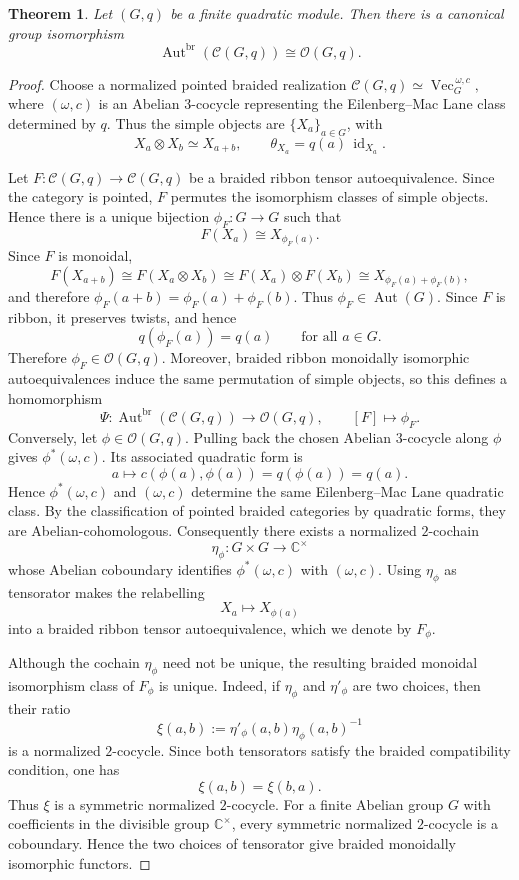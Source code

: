 \documentclass[12pt]{amsart}
\numberwithin{equation}{section}
\newtheorem{theorem}{Theorem}[section]
\theoremstyle{definition}
\begin{document}
\begin{theorem}
\label{thm:Eq-O}
Let $(G,q)$ be a finite quadratic module. Then there is a canonical group isomorphism
$$
\operatorname{Aut}^{\mathrm{br}}(\mathcal C(G,q))\cong \mathcal O(G,q).
$$
\end{theorem}

\begin{proof}
Choose a normalized pointed braided realization $
\mathcal C(G,q)\simeq \operatorname{Vec}^{\,\omega,c}_G,$ where $(\omega,c)$ is an Abelian $3$-cocycle representing the
Eilenberg--Mac Lane class determined by $q$. Thus the simple objects
are $\{X_a\}_{a\in G}$, with
$$
X_a\otimes X_b\simeq X_{a+b},
\qquad
\theta_{X_a}=q(a)\,\operatorname{id}_{X_a}.
$$

Let $F:\mathcal C(G,q)\rightarrow\mathcal C(G,q)$ be a braided ribbon tensor autoequivalence. Since the category is pointed, $F$ permutes the isomorphism classes of simple objects. Hence there is a unique bijection $\phi_F:G\to G$ such that
$$
F(X_a)\cong X_{\phi_F(a)}.
$$
Since $F$ is monoidal,
$$
F(X_{a+b})
\cong
F(X_a\otimes X_b)
\cong
F(X_a)\otimes F(X_b)
\cong
X_{\phi_F(a)+\phi_F(b)},
$$
and therefore $\phi_F(a+b)=\phi_F(a)+\phi_F(b).$ Thus $\phi_F\in\operatorname{Aut}(G)$. Since $F$ is ribbon, it preserves twists, and hence
$$
q(\phi_F(a))=q(a)\qquad \text{for all }a\in G.
$$
Therefore $\phi_F\in\mathcal O(G,q)$. Moreover, braided ribbon
monoidally isomorphic autoequivalences induce the same permutation of
simple objects, so this defines a homomorphism
$$
\Psi:
\operatorname{Aut}^{\mathrm{br}}(\mathcal C(G,q))
\longrightarrow
\mathcal O(G,q),
\qquad
[F]\longmapsto\phi_F.
$$
Conversely, let $\phi\in\mathcal O(G,q)$. Pulling back the chosen Abelian $3$-cocycle along $\phi$ gives $\phi^*(\omega,c).$ Its associated quadratic form is
$$
a\longmapsto c(\phi(a),\phi(a))
=q(\phi(a))
=q(a).
$$
Hence $\phi^*(\omega,c)$ and $(\omega,c)$ determine the same Eilenberg--Mac Lane quadratic class. By the classification of pointed braided categories by quadratic forms, they are Abelian-cohomologous. Consequently there exists a normalized $2$-cochain
$$
\eta_\phi:G\times G\longrightarrow\mathbb C^\times
$$
whose Abelian coboundary identifies $\phi^*(\omega,c)$ with $(\omega,c)$. Using $\eta_\phi$ as tensorator makes the relabelling
$$
X_a\longmapsto X_{\phi(a)}
$$
into a braided ribbon tensor autoequivalence, which we denote by $F_\phi$.

Although the cochain $\eta_\phi$ need not be unique, the resulting braided monoidal isomorphism class of $F_\phi$ is unique. Indeed, if $\eta_\phi$ and $\eta'_\phi$ are two choices, then their ratio
$$
\xi(a,b):=\eta'_\phi(a,b)\eta_\phi(a,b)^{-1}
$$
is a normalized $2$-cocycle. Since both tensorators satisfy the braided compatibility condition, one has
$$
\xi(a,b)=\xi(b,a).
$$
Thus $\xi$ is a symmetric normalized $2$-cocycle. For a finite Abelian group $G$ with coefficients in the divisible group $\mathbb C^\times$, every symmetric normalized $2$-cocycle is a coboundary. Hence the two choices of tensorator give braided monoidally isomorphic functors.


\end{proof}
\end{document}
